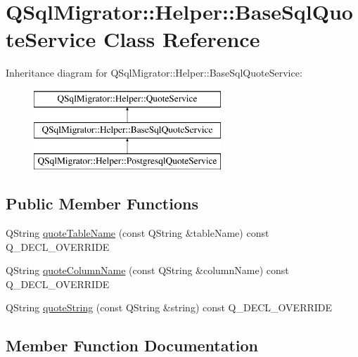 \hypertarget{class_q_sql_migrator_1_1_helper_1_1_base_sql_quote_service}{}\section{Q\+Sql\+Migrator\+:\+:Helper\+:\+:Base\+Sql\+Quote\+Service Class Reference}
\label{class_q_sql_migrator_1_1_helper_1_1_base_sql_quote_service}
Inheritance diagram for Q\+Sql\+Migrator\+:\+:Helper\+:\+:Base\+Sql\+Quote\+Service\+:\begin{figure}[H]
\begin{center}
\leavevmode
\includegraphics[height=3.000000cm]{class_q_sql_migrator_1_1_helper_1_1_base_sql_quote_service}
\end{center}
\end{figure}
\subsection*{Public Member Functions}
\begin{DoxyCompactItemize}
\item 
Q\+String \hyperlink{class_q_sql_migrator_1_1_helper_1_1_base_sql_quote_service_aacd2ed13fd6f57bc77b4870ac5105f9e}{quote\+Table\+Name} (const Q\+String \&table\+Name) const Q\+\_\+\+D\+E\+C\+L\+\_\+\+O\+V\+E\+R\+R\+I\+DE
\item 
Q\+String \hyperlink{class_q_sql_migrator_1_1_helper_1_1_base_sql_quote_service_a26aebafe6d736520b5661c82a4db4ae9}{quote\+Column\+Name} (const Q\+String \&column\+Name) const Q\+\_\+\+D\+E\+C\+L\+\_\+\+O\+V\+E\+R\+R\+I\+DE
\item 
Q\+String \hyperlink{class_q_sql_migrator_1_1_helper_1_1_base_sql_quote_service_a54146919b3027be887151bcc27c56dad}{quote\+String} (const Q\+String \&string) const Q\+\_\+\+D\+E\+C\+L\+\_\+\+O\+V\+E\+R\+R\+I\+DE
\end{DoxyCompactItemize}


\subsection{Member Function Documentation}
\mbox{\label{class_q_sql_migrator_1_1_helper_1_1_base_sql_quote_service_a26aebafe6d736520b5661c82a4db4ae9}} 

